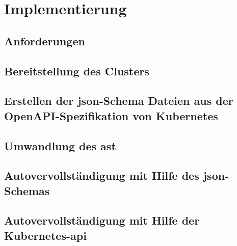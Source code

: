 \chapter{Implementierung}\label{ch:implementation}

\section{Anforderungen}

\section{Bereitstellung des Clusters}

\section{Erstellen der \acs{json}-Schema Dateien aus der OpenAPI-Spezifikation von Kubernetes}

\section{Umwandlung des \acs{ast}}

\section{Autovervollständigung mit Hilfe des \acs{json}-Schemas}

\section{Autovervollständigung mit Hilfe der Kubernetes-\acs{api}}


